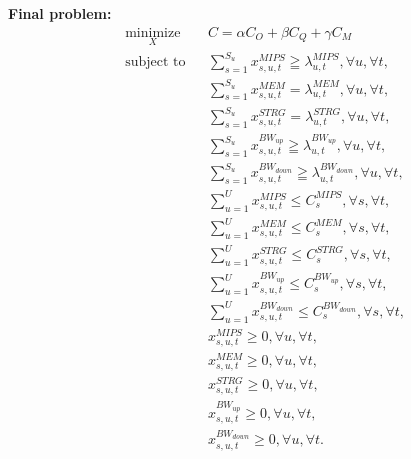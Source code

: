 \documentclass{article}
\begin{document}
\pagebreak
\noindent\textbf{Final problem:}\\[6pt]
\begin{equation*}
\begin{aligned}
& \underset{X}{\text{minimize}}
& & C = \alpha C_O + \beta C_Q + \gamma C_M \\
& \text{subject to}
& & \sum_{s=1}^{S_u} x^{MIPS}_{s,u,t} \geqq \lambda^{MIPS}_{u,t}, \forall u, \forall t, \\
&&& \sum_{s=1}^{S_u} x^{MEM}_{s,u,t} = \lambda^{MEM}_{u,t}, \forall u, \forall t, \\
&&& \sum_{s=1}^{S_u} x^{STRG}_{s,u,t} = \lambda^{STRG}_{u,t}, \forall u, \forall t, \\
&&& \sum_{s=1}^{S_u}x^{BW_{up}}_{s,u,t} \geqq \lambda^{BW_{up}}_{u,t}, \forall u, \forall t, \\
&&& \sum_{s=1}^{S_u}x^{BW_{down}}_{s,u,t} \geqq \lambda^{BW_{down}}_{u,t}, \forall u, \forall t, \\
&&& \sum_{u=1}^U x^{MIPS}_{s,u,t} \leq C^{MIPS}_{s}, \forall s, \forall t, \\
&&& \sum_{u=1}^U x^{MEM}_{s,u,t} \leq C^{MEM}_{s}, \forall s, \forall t, \\
&&& \sum_{u=1}^U x^{STRG}_{s,u,t} \leq C^{STRG}_{s}, \forall s, \forall t, \\
&&& \sum_{u=1}^U x^{BW_{up}}_{s,u,t} \leq C^{BW_{up}}_{s}, \forall s, \forall t, \\
&&& \sum_{u=1}^U x^{BW_{down}}_{s,u,t} \leq C^{BW_{down}}_{s}, \forall s, \forall t, \\[6pt]
&&& x^{MIPS}_{s,u,t} \geq 0, \forall u, \forall t, \\[6pt]
&&& x^{MEM}_{s,u,t} \geq 0, \forall u, \forall t, \\[6pt]
&&& x^{STRG}_{s,u,t} \geq 0, \forall u, \forall t, \\[6pt]
&&& x^{BW_{up}}_{s,u,t} \geq 0, \forall u, \forall t, \\[6pt]
&&& x^{BW_{down}}_{s,u,t} \geq 0, \forall u, \forall t.
\end{aligned}
\end{equation*}
\end{document}
